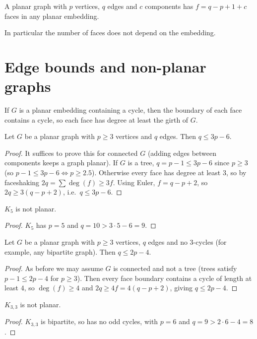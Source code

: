\begin{corollary}
A planar graph with $p$ vertices, $q$ edges and $c$ components has $f = q - p + 1 + c$ faces in
any planar embedding.
\end{corollary}

In particular the number of faces does not depend on the embedding.

\section{Edge bounds and non-planar graphs}

\begin{lemma}
If $G$ is a planar embedding containing a cycle, then the boundary of each face contains a cycle,
so each face has degree at least the girth of $G$.
\end{lemma}

\begin{theorem}
Let $G$ be a planar graph with $p \ge 3$ vertices and $q$ edges. Then $q \le 3p - 6$.
\end{theorem}
\begin{proof}
It suffices to prove this for connected $G$ (adding edges between components keeps a graph
planar). If $G$ is a tree, $q = p - 1 \le 3p - 6$ since $p \ge 3$ (so $p-1 \le 3p-6 \iff p\ge 2.5$).
Otherwise every face has degree at least $3$, so by faceshaking $2q = \sum\deg(f) \ge 3f$. Using
Euler, $f = q - p + 2$, so $2q \ge 3(q - p + 2)$, i.e.\ $q \le 3p - 6$.
\end{proof}

\begin{corollary}
$K_5$ is not planar.
\end{corollary}
\begin{proof}
$K_5$ has $p = 5$ and $q = 10 > 3\cdot5 - 6 = 9$.
\end{proof}

\begin{theorem}
Let $G$ be a planar graph with $p \ge 3$ vertices, $q$ edges and no $3$-cycles (for example, any
bipartite graph). Then $q \le 2p - 4$.
\end{theorem}
\begin{proof}
As before we may assume $G$ is connected and not a tree (trees satisfy $p - 1 \le 2p - 4$ for
$p\ge3$). Then every face boundary contains a cycle of length at least $4$, so $\deg(f)\ge 4$ and
$2q \ge 4f = 4(q - p + 2)$, giving $q \le 2p - 4$.
\end{proof}

\begin{corollary}
$K_{3,3}$ is not planar.
\end{corollary}
\begin{proof}
$K_{3,3}$ is bipartite, so has no odd cycles, with $p = 6$ and $q = 9 > 2\cdot6-4 = 8$.
\end{proof}

